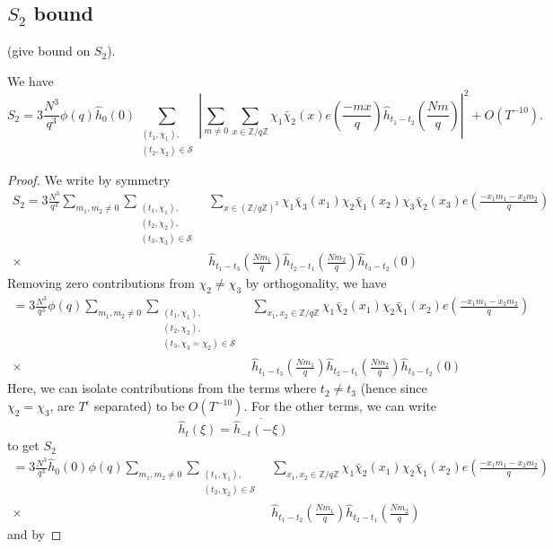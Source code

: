 \subsection{$S_2$ bound}
\begin{proposition}
    (give bound on $S_2$).
\end{proposition}

\begin{lemma}
    We have 
    \[
    S_2 = 3\frac{N^3}{q^3} \phi(q) \hat{h}_{0}\left(0\right) \sum_{\substack{(t_1,\chi_1),\\(t_2,\chi_2)\in\mathcal{S}}} \left|\sum_{m\neq 0} \sum_{x \in \mathbb{Z}/q\mathbb{Z}}\chi_1\bar{\chi}_2(x) e\left(\frac{-mx}{q}\right)
     \hat{h}_{t_1-t_2}\left(\frac{Nm}{q}\right)\right|^2 + O(T^{-10}).
\]
\end{lemma}
\begin{proof}
    We write by symmetry \begin{align*}
        S_2= 3\frac{N^3}{q^3}\sum_{m_1,m_2\neq 0}\sum_{\substack{(t_1,\chi_1),\\(t_2,\chi_2),\\(t_3,\chi_3)\in\mathcal{S}}} &\sum_{x\in (\mathbb{Z}/q\mathbb{Z})^3}\chi_1\bar{\chi}_3(x_1)\chi_2\bar{\chi}_1(x_2)\chi_3\bar{\chi}_2(x_3) e\left(\frac{-x_1m_1-x_2m_2}{q}\right)\\
        \times \ &\hat{h}_{t_1-t_3}\left(\frac{Nm_1}{q}\right)\hat{h}_{t_2-t_1}\left(\frac{Nm_2}{q}\right)\hat{h}_{t_3-t_2}\left(0\right)
    \end{align*}
    Removing zero contributions from $\chi_2\neq \chi_3$ by orthogonality,
    we have \begin{align*}
        =3\frac{N^3}{q^3} \phi(q) \sum_{m_1,m_2\neq 0}\sum_{\substack{(t_1,\chi_1),\\(t_2,\chi_2),\\(t_3,\chi_3=\chi_2)\in\mathcal{S}}} &\sum_{x_1,x_2 \in \mathbb{Z}/q\mathbb{Z}}\chi_1\bar{\chi}_2(x_1)\chi_2\bar{\chi}_1(x_2) e\left(\frac{-x_1m_1-x_2m_2}{q}\right)\\
        \times \ &\hat{h}_{t_1-t_3}\left(\frac{Nm_1}{q}\right)\hat{h}_{t_2-t_1}\left(\frac{Nm_2}{q}\right)\hat{h}_{t_3-t_2}\left(0\right)
    \end{align*}
    Here, we can isolate contributions from the terms where $t_2\neq t_3$ (hence since $\chi_2=\chi_3$, are $T^{\epsilon}$ separated) to be $O(T^{-10})$. For the other terms, we can write
    \[
        \hat{h}_t(\xi) = \overline{\hat{h}_{-t}(-\xi)}
    \]
    to get 
    \iffalse
    $S_2$
    \begin{align*}
        = 3\frac{N^3}{q^3} \hat{h}_{0}\left(0\right)\phi(q) \sum_{m_1,m_2\neq 0}\sum_{\substack{(t_1,\chi_1),\\(t_2,\chi_2)\in\mathcal{S}}} &\sum_{x_1,x_2 \in \mathbb{Z}/q\mathbb{Z}}\chi_1\bar{\chi}_2(x_1)\chi_2\bar{\chi}_1(x_2) e\left(\frac{-x_1m_1-x_2m_2}{q}\right)\\
        \times \ &\hat{h}_{t_1-t_2}\left(\frac{Nm_1}{q}\right)\hat{h}_{t_2-t_1}\left(\frac{Nm_2}{q}\right)
    \end{align*}
    and by 
    

\end{proof}
